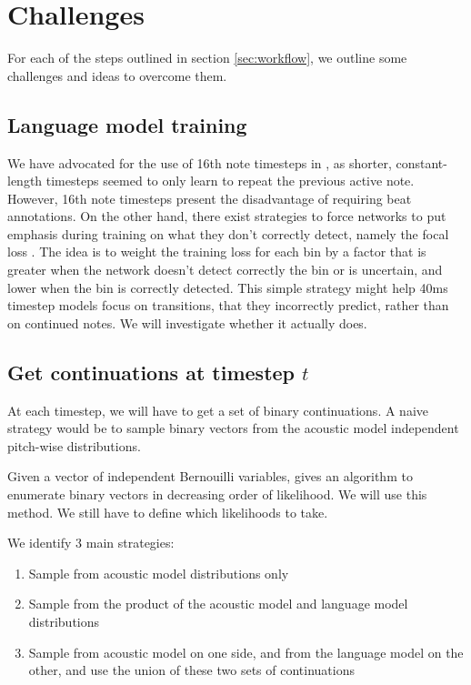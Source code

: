 \documentclass{article}
\begin{document}
\section{Challenges}

For each of the steps outlined in section \ref{sec:workflow}, we outline some challenges and ideas to overcome them.

\subsection{Language model training}
\label{sec:focalloss}

We have advocated for the use of 16th note timesteps in \citep{Ycart2017}, as shorter, constant-length timesteps seemed to only learn to repeat the previous active note.
However, 16th note timesteps present the disadvantage of requiring beat annotations.
On the other hand, there exist strategies to force networks to put emphasis during training on what they don't correctly detect, namely the focal loss \citep{lin2018focal}.
The idea is to weight the training loss for each bin by a factor that is greater when the network doesn't detect correctly the bin or is uncertain, and lower when the bin is correctly detected.
This simple strategy might help 40ms timestep models focus on transitions, that they incorrectly predict, rather than on continued notes.
We will investigate whether it actually does.

\subsection{Get continuations at timestep $t$}
\label{sec:sampling}

At each timestep, we will have to get a set of binary continuations.
A naive strategy would be to sample binary vectors from the acoustic model independent pitch-wise distributions.

Given a vector of independent Bernouilli variables, \citep{Boulanger-Lewandowski2013} gives an algorithm to enumerate binary vectors in decreasing order of likelihood.
We will use this method.
We still have to define which likelihoods to take.

We identify 3 main strategies:

\begin{enumerate}
\item Sample from acoustic model distributions only
\item Sample from the product of the acoustic model and language model distributions
\item Sample from acoustic model on one side, and from the language model on the other, and use the union of these two sets of continuations
\end{enumerate}
\end{document}

